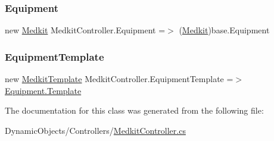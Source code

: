 \mbox{\label{class_medkit_controller_a2e945c06edfe2c7c810478dda73d889c}} 
\subsubsection{\texorpdfstring{Equipment}{Equipment}}
{\footnotesize\ttfamily new \mbox{\hyperlink{class_medkit}{Medkit}} Medkit\+Controller.\+Equipment =$>$ (\mbox{\hyperlink{class_medkit}{Medkit}})base.\+Equipment}

\mbox{\label{class_medkit_controller_a0d17d417f86a2e59593aa7130c3c3d0a}} 
\subsubsection{\texorpdfstring{Equipment\+Template}{EquipmentTemplate}}
{\footnotesize\ttfamily new \mbox{\hyperlink{class_medkit_template}{Medkit\+Template}} Medkit\+Controller.\+Equipment\+Template =$>$ \mbox{\hyperlink{class_equipment_a691c8de53afa564d0b1a0f1adb0978b7}{Equipment.\+Template}}}



The documentation for this class was generated from the following file\+:\begin{DoxyCompactItemize}
\item 
Dynamic\+Objects/\+Controllers/\mbox{\hyperlink{_medkit_controller_8cs}{Medkit\+Controller.\+cs}}\end{DoxyCompactItemize}
